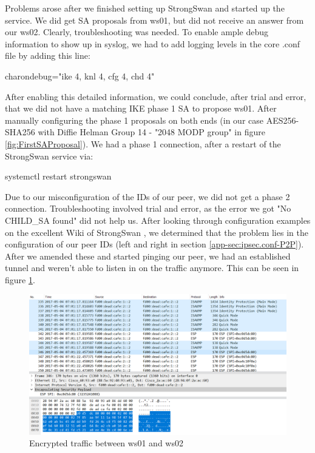 \documentclass[a4paper]{report}
\begin{document}
Problems arose after we finished setting up StrongSwan and started up the service. We did get SA proposals from ws01, but did not receive an answer from our ws02. Clearly, troubleshooting was needed. To enable ample debug information to show up in syslog, we had to add logging levels in the core .conf file by adding this line:
\begin{codebox}
	charondebug="ike 4, knl 4, cfg 4, chd 4"
\end{codebox}
After enabling this detailed information, we could conclude, after trial and error, that we did not have a matching IKE phase 1 SA to propose ws01. After manually configuring the phase 1 proposals on both ends (in our case AES256-SHA256 with Diffie Helman Group 14 - "2048 MODP group" in figure \ref{fig:FirstSAProposal}). We had a phase 1 connection, after a restart of the StrongSwan service via:
\begin{codebox}
	systemctl restart strongswan
\end{codebox}
Due to our misconfiguration of the IDs of our peer, we did not get a phase 2 connection. Troubleshooting involved trial and error, as the error we got "No CHILD\_SA found" did not help us. After looking through configuration examples on the excellent Wiki of StrongSwan \parencite{Lang2017}, we determined that the problem lies in the configuration of our peer IDs (left and right in section \ref{app-sec:ipsec.conf-P2P}). After we amended these and started pinging our peer, we had an established tunnel and weren't able to listen in on the traffic anymore. This can be seen in figure \ref{fig:TrafficEnc}.

\begin{figure}[htb]
	\label{fig:TrafficEnc}
	\includegraphics[width=\linewidth,keepaspectratio]{Traffic_encrypted}
	\caption{Encrypted traffic between ws01 and ws02}
\end{figure}
\end{document}
